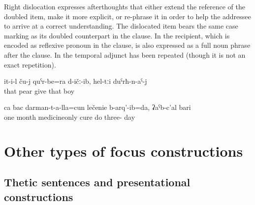 Right dislocation expresses afterthoughts that either extend the reference of the doubled item, make it more explicit, or re-phrase it in order to help the addressee to arrive at a correct understanding. The dislocated item bears the same case marking as its doubled counterpart in the clause. In  the recipient, which is encoded as reflexive pronoun in the clause, is also expressed as a full noun phrase after the clause. In  the temporal adjunct has been repeated (though it is not an exact repetition).
%
\begin{exe}
	\ex	\label{ex:He gave them pears, to the boys_IS}
	\gll	it-i-l	ču-j	quˁr-be=ra	d-ičː-ib,	hel-tːi	duˁrħ-n-aˁ-j\\
		that		pear	give	that	boy\\
	\glt	{}

	\ex	\label{ex:‎For one month I was cured only with pills, for 30 days_IS}
	\gll	ca	bac	darman-t-a-lla=cun	lečenie	b-arq'-ib=da,	ʡaˁb-c'al	bari\\
		one	month	medicineonly	cure	do three-	day\\
	\glt	{}
\end{exe}



\section{Other types of focus constructions}
\label{sec:Other types of focus constructions}



\subsection{Thetic sentences and presentational constructions}
\label{ssec:Thetic sentences and presentational constructions}

